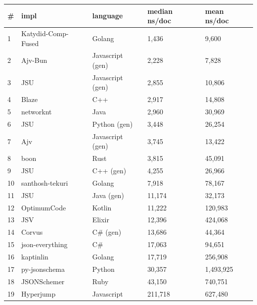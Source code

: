 \begin{tabular}{ll|l|ll}
\# & impl & language & median ns/doc & mean ns/doc \\
\hline
1 & Katydid-Comp-Fused & Golang & 1,436 & 9,600 \\
2 & Ajv-Bun & Javascript (gen) & 2,228 & 7,828 \\
3 & JSU & Javascript (gen) & 2,855 & 10,806 \\
4 & Blaze & C++ & 2,917 & 14,808 \\
5 & networknt & Java & 2,960 & 30,969 \\
6 & JSU & Python (gen) & 3,448 & 26,254 \\
7 & Ajv & Javascript (gen) & 3,745 & 13,422 \\
8 & boon & Rust & 3,815 & 45,091 \\
9 & JSU & C++ (gen) & 4,255 & 26,966 \\
10 & santhosh-tekuri & Golang & 7,918 & 78,167 \\
11 & JSU & Java (gen) & 11,174 & 32,173 \\
12 & OptimumCode & Kotlin & 11,222 & 120,983 \\
13 & JSV & Elixir & 12,396 & 424,068 \\
14 & Corvus & C\# (gen) & 13,686 & 44,364 \\
15 & json-everything & C\# & 17,063 & 94,651 \\
16 & kaptinlin & Golang & 17,719 & 256,908 \\
17 & py-jsonschema & Python & 30,357 & 1,493,925 \\
18 & JSONSchemer & Ruby & 43,150 & 740,751 \\
19 & Hyperjump & Javascript & 211,718 & 627,480 \\
\end{tabular}
